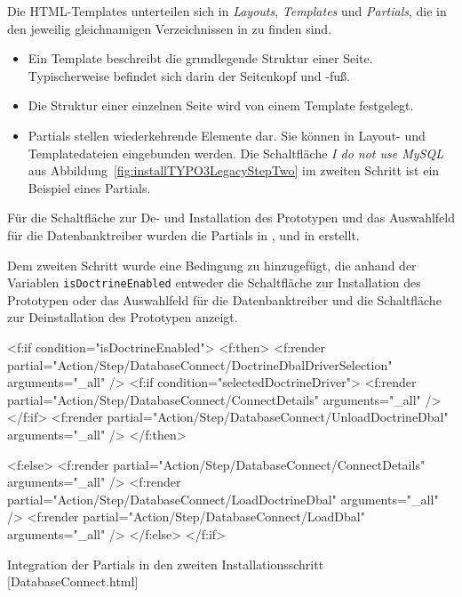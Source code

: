 Die HTML-Templates unterteilen sich in \textit{Layouts}, \textit{Templates} und \textit{Partials}, die in den jeweilig gleichnamigen Verzeichnissen in  zu finden sind.

\begin{itemize}
	\item Ein Template beschreibt die grundlegende Struktur einer Seite. Typischerweise befindet sich darin der Seitenkopf und -fuß.
	\item Die Struktur einer einzelnen Seite wird von einem Template festgelegt.
	\item Partials stellen wiederkehrende Elemente dar. Sie können in Layout- und Templatedateien eingebunden werden. Die Schaltfläche \textit{I do not use MySQL} aus Abbildung~\ref{fig:installTYPO3LegacyStepTwo} im zweiten Schritt ist ein Beispiel eines Partials.
\end{itemize}

Für die Schaltfläche zur De- und Installation des Prototypen und das Auswahlfeld für die Datenbanktreiber wurden die Partials in ,  und  in  erstellt.

Dem zweiten Schritt  wurde eine Bedingung zu hinzugefügt, die anhand der Variablen \texttt{isDoctrineEnabled} entweder die Schaltfläche zur Installation des Prototypen oder das Auswahlfeld für die Datenbanktreiber und die Schaltfläche zur Deinstallation des Prototypen anzeigt.

\begin{listing}
\begin{htmlcode}
<f:if condition="{isDoctrineEnabled}">
	<f:then>
		<f:render partial="Action/Step/DatabaseConnect/DoctrineDbalDriverSelection" arguments="{_all}" />
		<f:if condition="{selectedDoctrineDriver}">
			<f:render partial="Action/Step/DatabaseConnect/ConnectDetails" arguments="{_all}" />
		</f:if>
		<f:render partial="Action/Step/DatabaseConnect/UnloadDoctrineDbal" arguments="{_all}" />
	</f:then>

	<f:else>
		<f:render partial="Action/Step/DatabaseConnect/ConnectDetails" arguments="{_all}" />
		<f:render partial="Action/Step/DatabaseConnect/LoadDoctrineDbal" arguments="{_all}" />
		<f:render partial="Action/Step/DatabaseConnect/LoadDbal" arguments="{_all}" />
	</f:else>
</f:if>
\end{htmlcode}
\caption{Integration der Partials in den zweiten Installationsschritt [DatabaseConnect.html]}
\label{lst:integrateInstallPartial}
\end{listing}

